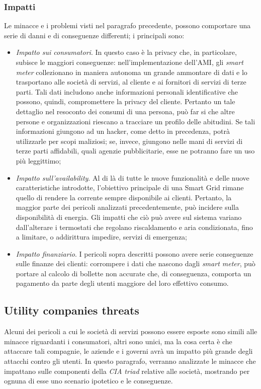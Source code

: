 \subsubsection{Impatti}
Le minacce e i problemi visti nel paragrafo precedente, possono comportare una serie di danni e di conseguenze differenti; i principali sono:
\begin{itemize}
\item \textit{Impatto sui consumatori}. In questo caso è la privacy che, in particolare, subisce le maggiori conseguenze: nell'implementazione dell'AMI, gli \textit{smart meter} collezionano in maniera autonoma un grande ammontare di dati e lo trasportano alle società di servizi, al cliente e ai fornitori di servizi di terze parti. Tali dati includono anche informazioni personali identificative che possono, quindi, compromettere la privacy del cliente. Pertanto un tale dettaglio nel resoconto dei consumi di una persona, può far si che altre persone e organizzazioni riescano a tracciare un profilo delle abitudini. Se tali informazioni giungono ad un hacker, come detto in precedenza, potrà utilizzarle per scopi maliziosi; se, invece, giungono nelle mani di servizi di terze parti affidabili, quali agenzie pubblicitarie, esse ne potranno fare un uso più leggittimo;
\item \textit{Impatto sull'availability}. Al di là di tutte le nuove funzionalità e delle nuove caratteristiche introdotte, l'obiettivo principale di una Smart Grid rimane quello di rendere la corrente sempre disponibile ai clienti. Pertanto, la maggior parte dei pericoli analizzati precedentemente, può incidere sulla disponibilità di energia. Gli impatti che ciò può avere sul sistema variano dall'alterare i termostati che regolano riscaldamento e aria  condizionata, fino a limitare, o addirittura impedire, servizi di emergenza;
\item \textit{Impatto finanziario}. I pericoli sopra descritti possono avere serie conseguenze sulle finanze dei clienti: corrompere i dati che nascono dagli \textit{smart meter}, può portare al calcolo di bollette non accurate che, di conseguenza, comporta un pagamento da parte degli utenti maggiore del loro effettivo consumo.
\end{itemize}

\subsection{Utility companies threats}
Alcuni dei pericoli a cui le società di servizi possono essere esposte sono simili alle minacce riguardanti i consumatori, altri sono unici, ma la cosa certa è che attaccare tali compagnie, le aziende e i governi avrà un impatto più grande degli attacchi contro gli utenti. \newline In questo paragrafo, verranno analizzate le minacce che impattano sulle componenti della \textit{CIA triad} relative alle società, mostrando per ognuna di esse uno scenario ipotetico e le conseguenze.

